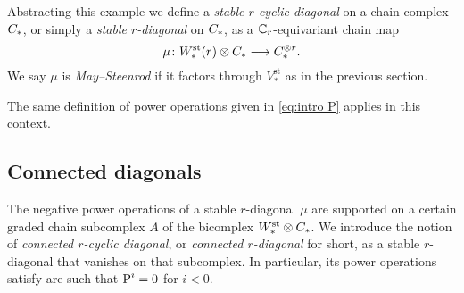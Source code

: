 Abstracting this example we define a \emph{stable $r$-cyclic diagonal} on a chain complex $C_{*}$, or simply a \textit{stable $r$-diagonal} on $C_{*}$, as a $\mathbb{C}_r$-equivariant chain map
\[
\mu \colon W^{\mathrm{st}}_{*}(r) \otimes C_{*} \longrightarrow C_{*}^{\otimes r}.
\]
We say $\mu$ is \textit{May--Steenrod} if it factors through $V_*^\mathrm{st}$ as in the previous section.

The same definition of power operations given in \cref{eq:intro P} applies in this context.



\subsection{Connected diagonals}

The negative power operations of a stable $r$-diagonal $\mu$ are supported on a certain graded chain subcomplex $A$ of the bicomplex $W^{\mathrm{st}}_{*} \otimes C_{*}$. We introduce the notion of \emph{connected $r$-cyclic diagonal}, or \textit{connected $r$-diagonal} for short, as a stable $r$-diagonal that vanishes on that subcomplex. In particular, its power operations satisfy are such that $\operatorname{P}^i = 0$ for $i<0$.

